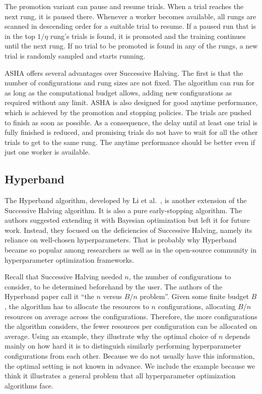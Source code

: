  The promotion variant can pause and resume trials. When a trial reaches the next rung, it is paused there. Whenever a worker becomes available, all rungs are scanned in descending order for a suitable trial to resume. If a paused run that is in the top $1/\eta$ rung's trials is found, it is promoted and the training continues until the next rung. If no trial to be promoted is found in any of the rungs, a new trial is randomly sampled and starts running.

 ASHA offers several advantages over Successive Halving. The first is that the number of configurations and rung sizes are not fixed. The algorithm can run for as long as the computational budget allows, adding new configurations as required without any limit. ASHA is also designed for good anytime performance, which is achieved by the promotion and stopping policies. The trials are pushed to finish as soon as possible. As a consequence, the delay until at least one trial is fully finished is reduced, and promising trials do not have to wait for all the other trials to get to the same rung. The anytime performance should be better even if just one worker is available.


\subsection{Hyperband}
The Hyperband algorithm, developed by Li et al.~\cite{li2018hyperband}, is another extension of the Successive Halving algorithm. It is also a pure early-stopping algorithm. The authors suggested extending it with Bayesian optimization but left it for future work. Instead, they focused on the deficiencies of Successive Halving, namely its reliance on well-chosen hyperparameters. That is probably why Hyperband became so popular among researchers as well as in the open-source community in hyperparameter optimization frameworks.

Recall that Successive Halving needed $n$, the number of configurations to consider, to be determined beforehand by the user. The authors of the Hyperband paper call it ``the $n$ versus $B/n$ problem''. Given some finite budget $B$, the algorithm has to allocate the resources to $n$ configurations, allocating $B/n$ resources on average across the configurations. Therefore, the more configurations the algorithm considers, the fewer resources per configuration can be allocated on average. Using an example, they illustrate why the optimal choice of $n$ depends mainly on how hard it is to distinguish similarly performing hyperparameter configurations from each other. Because we do not usually have this information, the optimal setting is not known in advance. We include the example because we think it illustrates a general problem that all hyperparameter optimization algorithms face.

